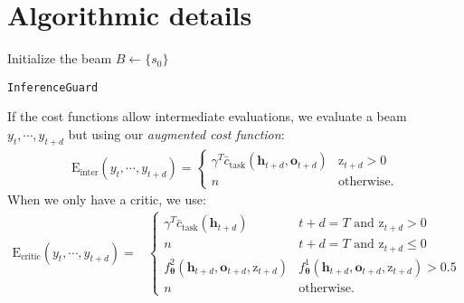 
\section{Algorithmic details}
\label{app:algo}

\begin{algorithm}[H]
\SetAlgoLined
{}

Initialize the beam $B \leftarrow \{s_0\}$\\
\caption{\texttt{InferenceGuard}}
\label{alg:inference_guard}
\end{algorithm}

If the cost functions allow intermediate evaluations, we evaluate a beam $y_t, \cdots, y_{t+d}$ but using our \emph{augmented cost function}:
\begin{align*}
\text{E}_\text{inter}(y_t, \cdots, y_{t+d}) = \begin{cases} 
\gamma^T \bar{c}_{\text{task}}({\bm h}_{t+d}, {\bm o}_{t+d}) &  \text{z}_{t+d} > 0\\
n & \text{otherwise} .
\end{cases}
\end{align*}
When we only have a critic, we use:
\begin{align*}
\text{E}_\text{critic}(y_t, \cdots, y_{t+d}) = 
&\begin{cases} 
\gamma^T \bar{c}_{\text{task}}({\bm h}_{t+d}) & t+d = T \text{ and } \text{z}_{t+d} > 0 \\ 
n & t+d = T \text{ and } \text{z}_{t+d} \leq 0 \\ 
 f^2_{\bm\theta}({\bm h}_{t+d}, {\bm o}_{t+d}, \text{z}_{t+d}) &  f^1_{\bm\theta}({\bm h}_{t+d}, {\bm o}_{t+d}, \text{z}_{t+d}) > 0.5\\
n & \text{otherwise}. 
\end{cases}
\end{align*}

